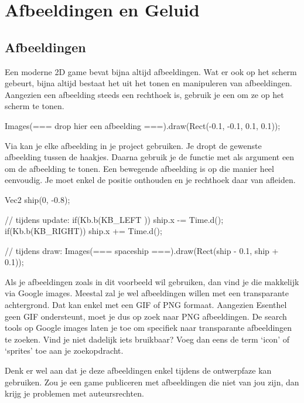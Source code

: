 \chapter{Afbeeldingen en Geluid}
\section{Afbeeldingen}
Een moderne 2D game bevat bijna altijd afbeeldingen. Wat er ook op het scherm gebeurt, bijna altijd bestaat het uit het tonen en manipuleren van afbeeldingen. Aangezien een afbeelding steeds een rechthoek is, gebruik je een  om ze op het scherm te tonen.

\begin{code}
Images(=== drop hier een afbeelding ===).draw(Rect(-0.1, -0.1, 0.1, 0.1));
\end{code}

Via  kan je elke afbeelding in je project gebruiken. Je dropt de gewenste afbeelding tussen de haakjes. Daarna gebruik je de  functie met als argument een  om de afbeelding te tonen. Een bewegende afbeelding is op die manier heel eenvoudig. Je moet enkel de positie onthouden en je rechthoek daar van afleiden.

\begin{code}
Vec2 ship(0, -0.8);

// tijdens update:
if(Kb.b(KB_LEFT )) ship.x -= Time.d();
if(Kb.b(KB_RIGHT)) ship.x += Time.d();

// tijdens draw:
Images(=== spaceship ===).draw(Rect(ship - 0.1,  ship + 0.1));
\end{code}

\begin{note}
Als je afbeeldingen zoals in dit voorbeeld wil gebruiken, dan vind je die makkelijk via Google images. Meestal zal je wel afbeeldingen willen met een transparante achtergrond. Dat kan enkel met een GIF of PNG formaat. Aangezien Esenthel geen GIF ondersteunt, moet je dus op zoek naar PNG afbeeldingen. De search tools op 
Google images laten je toe om specifiek naar transparante afbeeldingen te zoeken. Vind je niet dadelijk iets bruikbaar? Voeg dan eens de term `icon' of `sprites' toe aan je zoekopdracht.

Denk er wel aan dat je deze afbeeldingen enkel tijdens de ontwerpfaze kan gebruiken. Zou je een game publiceren met afbeeldingen die niet van jou zijn, dan krijg je problemen met auteursrechten.
\end{note}

